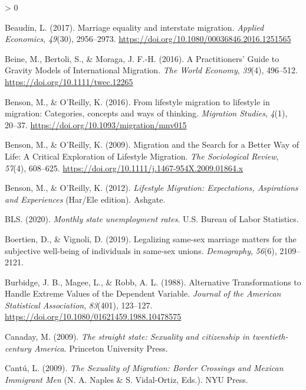\documentclass[
  11pt,
]{article}
\newlength{\cslhangindent}
\newenvironment{CSLReferences}[2] %
 {%
  \setlength{\parindent}{0pt}
  \ifodd #1 \everypar{\setlength{\hangindent}{\cslhangindent}}\ignorespaces\fi
  \ifnum #2 > 0
  \setlength{\parskip}{#2\baselineskip}
  \fi
 }%
 {}
\begin{document}
\begin{CSLReferences}{1}{0}
\leavevmode\hypertarget{ref-beaudin_2017}{}%
Beaudin, L. (2017). Marriage equality and interstate migration. \emph{Applied Economics}, \emph{49}(30), 2956--2973. \url{https://doi.org/10.1080/00036846.2016.1251565}

\leavevmode\hypertarget{ref-beine_2016}{}%
Beine, M., Bertoli, S., \& Moraga, J. F.-H. (2016). A {Practitioners}' {Guide} to {Gravity Models} of {International Migration}. \emph{The World Economy}, \emph{39}(4), 496--512. \url{https://doi.org/10.1111/twec.12265}

\leavevmode\hypertarget{ref-benson_2016}{}%
Benson, M., \& O'Reilly, K. (2016). From lifestyle migration to lifestyle in migration: {Categories}, concepts and ways of thinking. \emph{Migration Studies}, \emph{4}(1), 20--37. \url{https://doi.org/10.1093/migration/mnv015}

\leavevmode\hypertarget{ref-benson_2009}{}%
Benson, M., \& O'Reilly, K. (2009). Migration and the {Search} for a {Better Way} of {Life}: {A Critical Exploration} of {Lifestyle Migration}. \emph{The Sociological Review}, \emph{57}(4), 608--625. \url{https://doi.org/10.1111/j.1467-954X.2009.01864.x}

\leavevmode\hypertarget{ref-benson_2012}{}%
Benson, M., \& O'Reilly, K. (2012). \emph{Lifestyle {Migration}: {Expectations}, {Aspirations} and {Experiences}} (Har/Ele edition). {Ashgate}.

\leavevmode\hypertarget{ref-bls_2020}{}%
BLS. (2020). \emph{Monthly state unemployment rates}. {U.S. Bureau of Labor Statistics}.

\leavevmode\hypertarget{ref-boertien_2019}{}%
Boertien, D., \& Vignoli, D. (2019). Legalizing same-sex marriage matters for the subjective well-being of individuals in same-sex unions. \emph{Demography}, \emph{56}(6), 2109--2121.

\leavevmode\hypertarget{ref-burbidge_1988_alternative}{}%
Burbidge, J. B., Magee, L., \& Robb, A. L. (1988). Alternative {Transformations} to {Handle Extreme Values} of the {Dependent Variable}. \emph{Journal of the American Statistical Association}, \emph{83}(401), 123--127. \url{https://doi.org/10.1080/01621459.1988.10478575}

\leavevmode\hypertarget{ref-canaday_2009}{}%
Canaday, M. (2009). \emph{The straight state: Sexuality and citizenship in twentieth-century {America}}. {Princeton University Press}.

\leavevmode\hypertarget{ref-cantu_2009}{}%
Cantú, L. (2009). \emph{The {Sexuality} of {Migration}: {Border Crossings} and {Mexican Immigrant Men}} (N. A. Naples \& S. Vidal-Ortiz, Eds.). {NYU Press}.


\end{CSLReferences}
\end{document}
